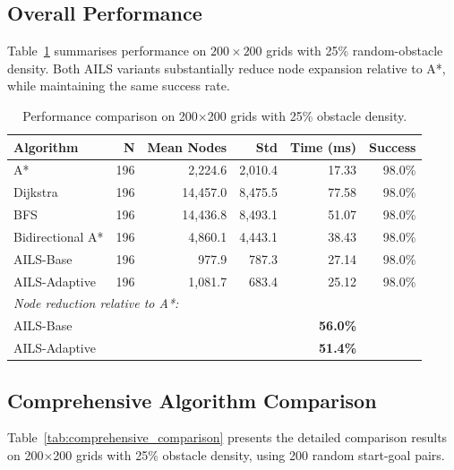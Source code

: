 \documentclass[journal]{IEEEtran}
\begin{document}
\subsection{Overall Performance}

Table~\ref{tab:overall_performance} summarises performance on $200{\times}200$ grids with 25\% random-obstacle density.
Both AILS variants substantially reduce node expansion relative to A*, while maintaining the same success rate.

\begin{table}[h]
\centering
\caption{Performance comparison on 200$\times$200 grids with 25\% obstacle density.}
\label{tab:overall_performance}
\footnotesize
\begin{tabular}{lrrrrr}
\toprule
\textbf{Algorithm} & \textbf{N} & \textbf{Mean Nodes} & \textbf{Std} & \textbf{Time (ms)} & \textbf{Success} \\
\midrule
A* & 196 & 2,224.6 & 2,010.4 & 17.33 & 98.0\% \\
Dijkstra & 196 & 14,457.0 & 8,475.5 & 77.58 & 98.0\% \\
BFS & 196 & 14,436.8 & 8,493.1 & 51.07 & 98.0\% \\
Bidirectional A* & 196 & 4,860.1 & 4,443.1 & 38.43 & 98.0\% \\
AILS-Base & 196 & 977.9 & 787.3 & 27.14 & 98.0\% \\
AILS-Adaptive & 196 & 1,081.7 & 683.4 & 25.12 & 98.0\% \\
\midrule
\multicolumn{5}{l}{\textit{Node reduction relative to A*:}} \\
\multicolumn{2}{l}{AILS-Base} & \multicolumn{3}{r}{\textbf{56.0\%}} \\
\multicolumn{2}{l}{AILS-Adaptive} & \multicolumn{3}{r}{\textbf{51.4\%}} \\
\bottomrule
\end{tabular}
\normalsize
\end{table}

\subsection{Comprehensive Algorithm Comparison}

Table~\ref{tab:comprehensive_comparison} presents the detailed comparison results on 200$\times$200 grids with 25\% obstacle density, using 200 random start-goal pairs.
\end{document}
